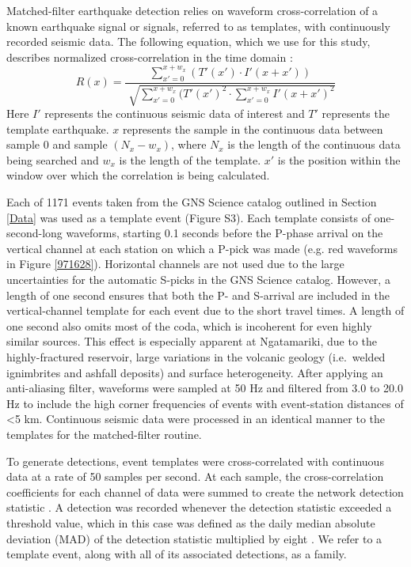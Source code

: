 Matched-filter earthquake detection relies on waveform cross-correlation of a
known earthquake signal or signals, referred to as templates, with continuously recorded seismic data. The following equation, which we use for this study, describes normalized cross-correlation in the time domain \citep{Chamberlain_2017}:
\begin{equation}
R(x) = \frac{\sum_{x'=0}^{x+w_{x}}(T'(x') \cdot I'(x + x'))}{\sqrt[]{\sum_{x'=0}^{x+w_{x}}(T'(x')^2 \cdot \sum_{x'=0}^{x+w_{x}}I'(x + x')^2}}
\end{equation}
Here $I'$ represents the continuous seismic data of interest and $T'$ represents the template earthquake. $x$ represents the sample in the continuous data between sample $0$ and sample $(N_{x} - w_{x})$, where $N_{x}$ is the length of the continuous data being searched and $w_{x}$ is the length of the template. $x'$ is the position within the window over which the correlation is being calculated.

Each of 1171 events taken from the GNS Science catalog outlined in Section \ref{Data} was used as a template event (Figure S3). Each template consists of one-second-long waveforms, starting 0.1 seconds before the P-phase arrival on the vertical channel at each station on which a P-pick was made (e.g. red waveforms in Figure \ref{971628}). Horizontal channels are not used due to the large uncertainties for the automatic S-picks in the GNS Science catalog. However, a length of one second ensures that both the P- and S-arrival are included in the vertical-channel template for each event due to the short travel times. A length of one second also omits most of the coda, which is incoherent for even highly similar sources. This effect is especially apparent at Ngatamariki, due to the highly-fractured reservoir, large variations in the volcanic geology (i.e.\ welded ignimbrites and ashfall deposits) and surface heterogeneity. After applying an anti-aliasing filter, waveforms were sampled at 50 Hz and filtered from 3.0 to 20.0 Hz to include the high corner frequencies of events with event-station distances of \textless5 km. Continuous seismic data were processed in an identical manner to the templates for the matched-filter routine.

To generate detections, event templates were cross-correlated with continuous
data at a rate of 50 samples per second. At each sample, the cross-correlation
coefficients for each channel of data were summed to create the network detection statistic \citep{Shelly_2007}. A detection was recorded whenever the detection statistic exceeded a threshold value, which in this case was defined as the daily median absolute deviation (MAD) of the detection statistic multiplied by eight \citep[as suggested by][]{Shelly_2007}. We refer to a template event, along with all of its associated detections, as a family.

